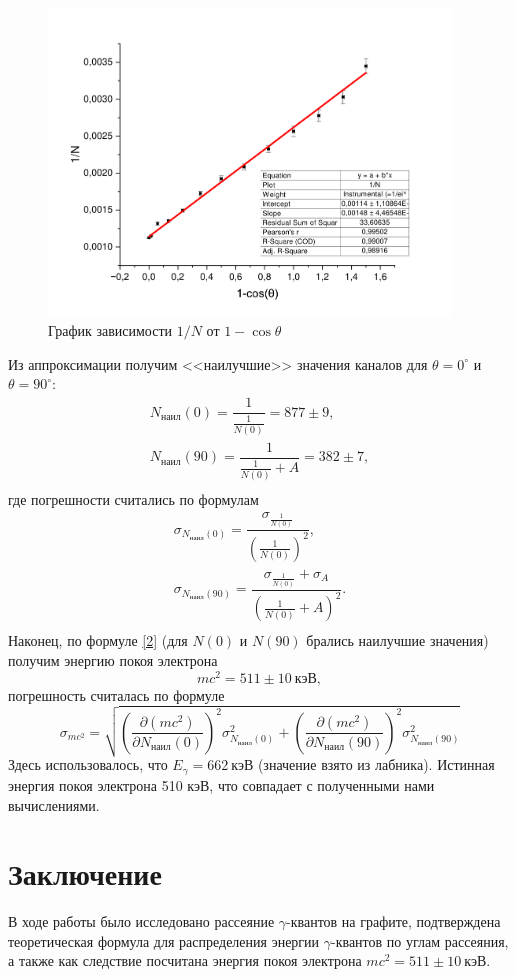 \documentclass[a4paper,12pt]{article}
\theoremstyle{definition}
\begin{document}
\begin{figure}[h]
  \includegraphics[width = 0.95\textwidth]{1.pdf}
  \centering
  \caption{График зависимости $1/N$ от $1-\cos \theta$}
\end{figure}

Из аппроксимации получим <<наилучшие>> значения каналов для $\theta = 0^\circ$ и $\theta = 90^\circ$:
\[\begin{array}{l}
N_{\text{наил}}(0) = \dfrac{1}{\frac{1}{N(0)}} = 877 \pm 9,\\[12pt]
N_{\text{наил}}(90) = \dfrac{1}{\frac{1}{N(0)}+A} = 382 \pm 7,\\
\end{array}
\]
где погрешности считались по формулам
\[
\begin{array}{l}
\sigma_{N_{\text{наил}}(0)} = \dfrac{\sigma_{\frac{1}{N(0)}}}{(\frac{1}{N(0)})^2},\\[14pt]
\sigma_{N_{\text{наил}}(90)} = \dfrac{\sigma_{\frac{1}{N(0)}} + \sigma_{A}}{(\frac{1}{N(0)}+A)^2}.\\
\end{array}
\]
Наконец, по формуле \eqref{2} (для $N(0)$ и $N(90)$ брались наилучшие значения) получим энергию покоя электрона
\[mc^2 = 511 \pm 10~\text{кэВ},\]
погрешность считалась по формуле
\[\sigma_{mc^2} = \sqrt{ \left( \dfrac{\partial (mc^2)}{\partial N_{\text{наил}}(0)} \right)^2 \sigma_{N_{\text{наил}}(0)}^2 +\left( \dfrac{\partial (mc^2)}{\partial N_{\text{наил}}(90)} \right)^2 \sigma_{N_{\text{наил}}(90)}^2 }\]
Здесь использовалось, что $E_\gamma = 662~\text{кэВ}$ (значение взято из лабника). Истинная энергия покоя электрона 510 кэВ, что совпадает с полученными нами вычислениями.
\section{Заключение}
В ходе работы было исследовано рассеяние $\gamma$-квантов на графите, подтверждена теоретическая формула для распределения энергии $\gamma$-квантов по углам рассеяния, а также как следствие посчитана энергия покоя электрона $mc^2 = 511 \pm 10 ~\text{кэВ}$.
\end{document}
